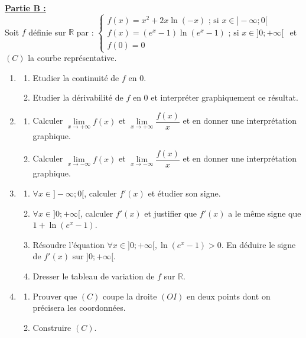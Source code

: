 \documentclass[12pt,a4paper]{article}
\begin{document}
\vspace{0.5cm}

\noindent \underline{\textbf{Partie B :}} \\
Soit $f$ définie sur $\mathbb{R}$ par : 
$\begin{cases} f(x) = x^2 + 2x\ln(-x) \text{ ; si } x \in ]-\infty; 0[ \\ f(x) = (e^x - 1)\ln(e^x - 1) \text{ ; si } x \in ]0; +\infty[ \\ f(0) = 0 \end{cases}$ et $(C)$ la courbe représentative.
\begin{enumerate}
    \item \begin{enumerate}
        \item Etudier la continuité de $f$ en 0.
        \item Etudier la dérivabilité de $f$ en 0 et interpréter graphiquement ce résultat.
    \end{enumerate}
    \item \begin{enumerate}
        \item Calculer $\lim\limits_{x \to +\infty} f(x)$ et $\lim\limits_{x \to +\infty} \dfrac{f(x)}{x}$ et en donner une interprétation graphique.
        \item Calculer $\lim\limits_{x \to -\infty} f(x)$ et $\lim\limits_{x \to -\infty} \dfrac{f(x)}{x}$ et en donner une interprétation graphique.
    \end{enumerate}
    \item \begin{enumerate}
        \item $\forall x \in ]-\infty; 0[$, calculer $f'(x)$ et étudier son signe.
        \item $\forall x \in ]0; +\infty[$, calculer $f'(x)$ et justifier que $f'(x)$ a le même signe que $1 + \ln(e^x - 1)$.
        \item Résoudre l'équation $\forall x \in ]0; +\infty[, \ln(e^x - 1) > 0$. En déduire le signe de $f'(x)$ sur $]0; +\infty[$.
        \item Dresser le tableau de variation de $f$ sur $\mathbb{R}$.
    \end{enumerate}
    \item \begin{enumerate}
        \item Prouver que $(C)$ coupe la droite $(OI)$ en deux points dont on précisera les coordonnées.
        \item Construire $(C)$.

\end{enumerate}
\end{enumerate}
\end{document}
